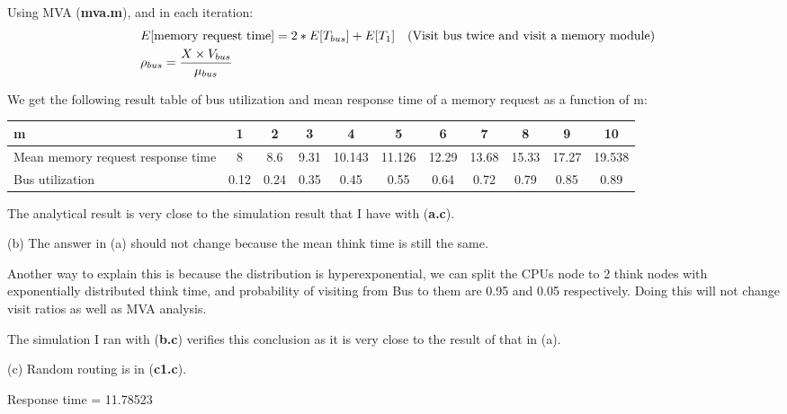 \documentclass[12pt,fleqn]{article}
\newcommand*{\BEGIN}{\ensuremath{& \ \ }}
\begin{document}
  Using MVA (\textbf{mva.m}), and in each iteration:
  \begin{equation*}
    \begin{split}
      \BEGIN E[\text{memory request time}] = 2 * E[T_{bus}] + E[T_1] & \text{(Visit bus twice and visit a memory module)} \\
      \BEGIN \rho_{bus} = \frac{X \times V_{bus}}{\mu_{bus}}
    \end{split}
  \end{equation*}

  We get the following result table of bus utilization and mean response time of a memory request
  as a function of m:
  \begin{center}
    \begin{tabular}{ |p{3cm}|c|c|c|c|c|c|c|c|c|c| }
      \hline
      m & 1 & 2 & 3 & 4 & 5 & 6 & 7 & 8 & 9 & 10 \\
      \hline
      Mean memory request response time & 8 & 8.6 & 9.31 & 10.143 & 11.126 & 12.29 & 13.68 & 15.33 & 17.27 & 19.538 \\
      \hline
      Bus utilization & 0.12 & 0.24 & 0.35 & 0.45 & 0.55 & 0.64 & 0.72 & 0.79 & 0.85 & 0.89 \\
      \hline
    \end{tabular}
  \end{center}
  The analytical result is very close to the simulation result that I have with (\textbf{a.c}).

  \item[(b)] The answer in (a) should not change because the mean think time is still the same.

  Another way to explain this is because the distribution is hyperexponential, we can split the CPUs node
  to 2 think nodes with exponentially distributed think time, and probability of visiting from Bus to them are
  0.95 and 0.05 respectively. Doing this will not change visit ratios as well as MVA analysis.

  The simulation I ran with (\textbf{b.c}) verifies this conclusion as it is very close to the result of that in (a).

  \item[(c)]
  Random routing is in (\textbf{c1.c}).

  \bi
  \item Response time = 11.78523
\end{document}
